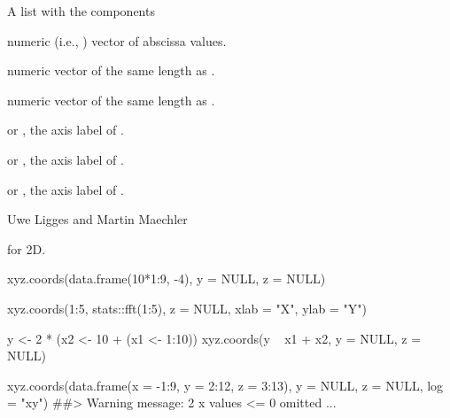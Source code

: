 %
\begin{Value}
A list with the components
\begin{ldescription}
\item[\code{x}] numeric (i.e., ) vector of abscissa values.
\item[\code{y}] numeric vector of the same length as .
\item[\code{z}] numeric vector of the same length as .
\item[\code{xlab}]  or , the axis label of .
\item[\code{ylab}]  or , the axis label of .
\item[\code{zlab}]  or , the axis label of .
\end{ldescription}
\end{Value}
%
\begin{Author}\relax
Uwe Ligges and Martin Maechler
\end{Author}
%
\begin{SeeAlso}\relax
{} for 2D.
\end{SeeAlso}
%
\begin{Examples}
\begin{ExampleCode}
xyz.coords(data.frame(10*1:9, -4), y = NULL, z = NULL)

xyz.coords(1:5, stats::fft(1:5), z = NULL, xlab = "X", ylab = "Y")

y <- 2 * (x2 <- 10 + (x1 <- 1:10))
xyz.coords(y ~ x1 + x2, y = NULL, z = NULL)

xyz.coords(data.frame(x = -1:9, y = 2:12, z = 3:13), y = NULL, z = NULL,
           log = "xy")
##> Warning message: 2 x values <= 0 omitted ...
\end{ExampleCode}
\end{Examples}
\clearpage
